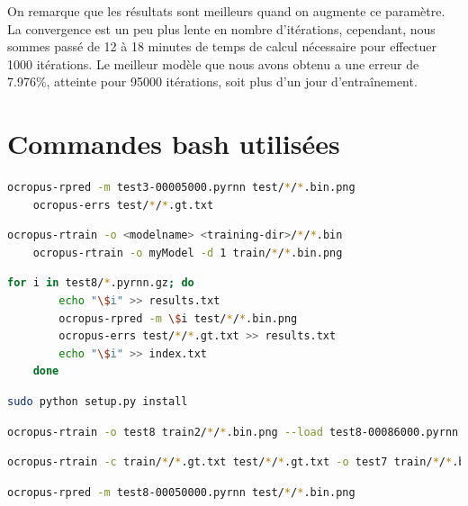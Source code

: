 \documentclass{article}
\begin{document}
On remarque que les résultats sont meilleurs quand on augmente ce paramètre. La convergence est un peu plus lente en nombre d'itérations, cependant, nous sommes passé de 12 à 18 minutes de temps de calcul nécessaire pour effectuer 1000 itérations. Le meilleur modèle que nous avons obtenu a une erreur de 7.976\%, atteinte pour 95000 itérations, soit plus d'un jour d'entraînement. 
\section{Commandes bash utilisées}

\begin{lstlisting}[language=bash]
    ocropus-rpred -m test3-00005000.pyrnn test/*/*.bin.png
    ocropus-errs test/*/*.gt.txt
\end{lstlisting}

\begin{lstlisting}[language=bash]
    ocropus-rtrain -o <modelname> <training-dir>/*/*.bin
    ocropus-rtrain -o myModel -d 1 train/*/*.bin.png
\end{lstlisting}

\begin{lstlisting}[language=bash]
    for i in test8/*.pyrnn.gz; do
        echo "\$i" >> results.txt
        ocropus-rpred -m \$i test/*/*.bin.png
        ocropus-errs test/*/*.gt.txt >> results.txt
        echo "\$i" >> index.txt
    done
\end{lstlisting}

\begin{lstlisting}[language=bash]
    sudo python setup.py install
\end{lstlisting}

\begin{lstlisting}[language=bash]
    ocropus-rtrain -o test8 train2/*/*.bin.png --load test8-00086000.pyrnn
\end{lstlisting}

\begin{lstlisting}[language=bash]
    ocropus-rtrain -c train/*/*.gt.txt test/*/*.gt.txt -o test7 train/*/*.bin.png --load test7-00073000.pyrnn
\end{lstlisting}

\begin{lstlisting}[language=bash]
    ocropus-rpred -m test8-00050000.pyrnn test/*/*.bin.png
\end{lstlisting}
\end{document}
